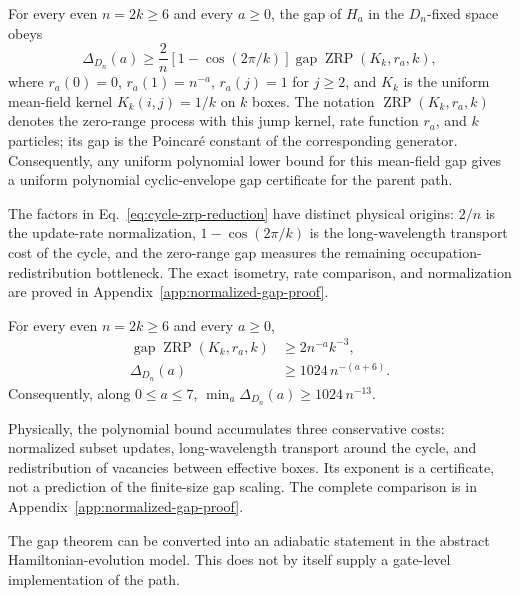 \begin{proposition}
\label{prop:cycle-zrp-reduction}
For every even $n=2k\geq6$ and every $a\geq0$, the gap of $H_a$ in the
$D_n$-fixed space obeys
\begin{equation}
 \Delta_{D_n}(a)
 \geq \frac{2}{n}[1-\cos(2\pi/k)]
 \operatorname{gap}\operatorname{ZRP}(K_k,r_a,k),
 \label{eq:cycle-zrp-reduction}
\end{equation}
where $r_a(0)=0$, $r_a(1)=n^{-a}$, $r_a(j)=1$ for $j\geq2$, and $K_k$
is the uniform mean-field kernel $K_k(i,j)=1/k$ on $k$ boxes.  The notation
$\operatorname{ZRP}(K_k,r_a,k)$ denotes the zero-range process with this
jump kernel, rate function $r_a$, and $k$ particles; its gap is the
Poincar\'e constant of the corresponding generator.  Consequently, any
uniform polynomial lower bound for this mean-field gap gives a uniform
polynomial cyclic-envelope gap certificate for the parent path.
\end{proposition}

The factors in Eq.~\eqref{eq:cycle-zrp-reduction} have distinct physical
origins: $2/n$ is the update-rate normalization, $1-\cos(2\pi/k)$ is the
long-wavelength transport cost of the cycle, and the zero-range gap measures
the remaining occupation-redistribution bottleneck.  The exact isometry,
rate comparison, and normalization are proved in
Appendix~\ref{app:normalized-gap-proof}.

\begin{proposition}
\label{prop:cycle-uniform-gap}
For every even $n=2k\geq6$ and every $a\geq0$,
\begin{align}
 \operatorname{gap}\operatorname{ZRP}(K_k,r_a,k)
 &\geq 2n^{-a}k^{-3},
 \label{eq:mean-field-bound}\\
 \Delta_{D_n}(a)&\geq1024\,n^{-(a+6)}.
 \label{eq:uniform-cyclic-gap}
\end{align}
Consequently, along $0\leq a\leq7$,
$\min_a\Delta_{D_n}(a)\geq1024\,n^{-13}$.
\end{proposition}

Physically, the polynomial bound accumulates three conservative costs:
normalized subset updates, long-wavelength transport around the cycle, and
redistribution of vacancies between effective boxes.  Its exponent is a
certificate, not a prediction of the finite-size gap scaling.  The complete
comparison is in Appendix~\ref{app:normalized-gap-proof}.

The gap theorem can be converted into an adiabatic statement in the
abstract Hamiltonian-evolution model.  This does not by itself supply a
gate-level implementation of the path.

